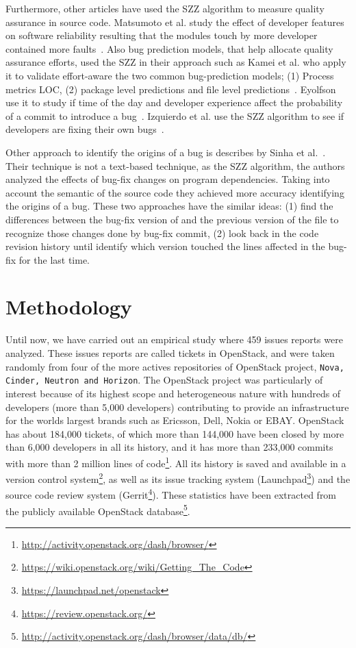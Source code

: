 \documentclass[ifip]{svmult}
\begin{document}
Furthermore, other articles have used the SZZ algorithm to measure quality assurance in source code. Matsumoto et al. study the effect of developer features on software reliability resulting that the modules touch by more developer contained more faults~\cite{matsumoto2010analysis}. Also bug prediction models, that help allocate quality assurance efforts, used the SZZ in their approach such as Kamei et al. who apply it to validate effort-aware the two common bug-prediction models; (1) Process metrics LOC, (2) package level predictions and file level predictions~\cite{kamei2010revisiting}. Eyolfson use it to study if time of the day and developer experience affect the probability of a commit to introduce a bug~\cite{eyolfson2011time}. Izquierdo et al. use the SZZ algorithm to see if developers are fixing their own bugs~\cite{izquierdo2011developers}.

Other approach to identify the origins of a bug is describes by Sinha et al.~\cite{sinha2010buginnings}. Their technique is not a text-based technique, as the SZZ algorithm, the authors analyzed the effects of bug-fix changes on program dependencies. Taking into account the semantic of the source code they achieved more accuracy identifying the origins of a bug. These two approaches have the similar ideas: (1) find the differences between the bug-fix version of and the previous version of the file to recognize those changes done by bug-fix commit, (2) look back in the code revision history until identify which version touched the lines affected in the bug-fix for the last time.


\section{Methodology}
\label{sec:methodology}

Until now, we have carried out an empirical study where 459 issues reports were analyzed. These issues reports are called tickets in OpenStack, and were taken randomly from four of the more actives repositories of OpenStack project, \texttt{Nova, Cinder, Neutron and Horizon}. The OpenStack project was particularly of interest because of its highest scope and heterogeneous nature with hundreds of developers (more than 5,000 developers) contributing to provide an infrastructure for the worlds largest brands such as Ericsson, Dell, Nokia or EBAY. OpenStack has about 184,000 tickets, of which more than 144,000 have been closed by more than 6,000 developers in all its history, and it has more than 233,000 commits with more than 2 million lines of code\footnote{\url{http://activity.openstack.org/dash/browser/}}. All its history is saved and available in a version control system\footnote{\url{https://wiki.openstack.org/wiki/Getting_The_Code}}, as well as its issue tracking system (Launchpad\footnote{\url{https://launchpad.net/openstack}}) and the source code review system (Gerrit\footnote{\url{https://review.openstack.org/}}). These statistics have been extracted from the publicly available OpenStack database\footnote{\url{http://activity.openstack.org/dash/browser/data/db/}}. 
\end{document}
